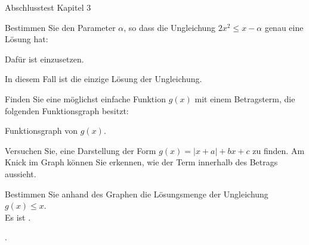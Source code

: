 \begin{MTest}{Abschlusstest Kapitel 3}

\begin{MExercise}
Bestimmen Sie den Parameter $\alpha$, so dass die Ungleichung $2x^2\leq x-\alpha$ genau eine Lösung hat:
\begin{MExerciseItems}
\item{Dafür ist  einzusetzen.}
\item{In diesem Fall ist  die einzige Lösung der Ungleichung.}
\end{MExerciseItems}
\end{MExercise}


\begin{MExercise}
Finden Sie eine möglichst einfache Funktion $g(x)$ mit einem Betragsterm, die folgenden Funktionsgraph besitzt:
\begin{center}
\par
Funktionsgraph von $g(x)$.
\end{center}
Versuchen Sie, eine Darstellung der Form $g(x)=|x+a|+b x+c$ zu finden. Am Knick im Graph können Sie erkennen, wie der Term innerhalb des Betrags aussieht.

\begin{MExerciseItems}
\item{Bestimmen Sie anhand des Graphen die Lösungsmenge der Ungleichung $g(x)\leq x$.\\Es ist \MEquationItem{$\ML$}{\MLIntervalQuestion{20}{(-infty;1]}{5}{AUX1}}.}
\item{. \\}
\end{MExerciseItems}
\end{MExercise}


\end{MTest}
